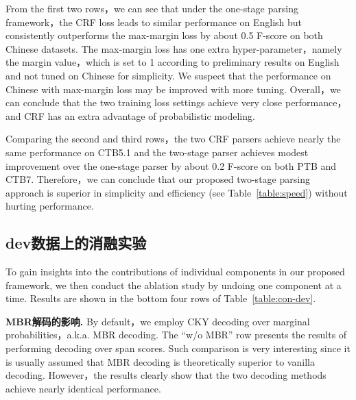 From the first two rows，we can see that
under the one-stage parsing framework，the CRF loss leads to similar performance on English
but consistently outperforms the max-margin loss by about 0.5 F-score on both Chinese datasets.
The max-margin loss has one extra hyper-parameter，namely the margin value，which is set to 1 according to preliminary results on English and not tuned on Chinese for simplicity.
We suspect that the performance on Chinese with max-margin loss may be improved with more tuning.
Overall，we can conclude that the two training loss settings achieve very close performance，and CRF has an extra advantage of probabilistic modeling.

Comparing the second and third rows，the two CRF parsers achieve nearly the same performance on CTB5.1 and the two-stage parser achieves modest improvement over the one-stage parser by about 0.2 F-score on both PTB and CTB7.
Therefore，we can conclude that our proposed two-stage parsing approach is superior in simplicity and efficiency (see Table~\ref{table:speed}) without hurting performance.




\subsection{dev数据上的消融实验}

To gain insights into the contributions of individual components in our proposed framework,
we then conduct the ablation study by undoing one component at a time. %
Results are shown in the bottom four rows of Table~\ref{table:con-dev}.

\noindent\textbf{MBR解码的影响.}
By default，we employ CKY decoding over marginal probabilities，a.k.a. MBR decoding.
The ``w/o MBR'' row presents the results of performing decoding over span scores.
Such comparison is very interesting since it is usually assumed that MBR decoding is theoretically superior to vanilla decoding.
However，the results clearly show that
the two decoding methods achieve nearly identical performance.

